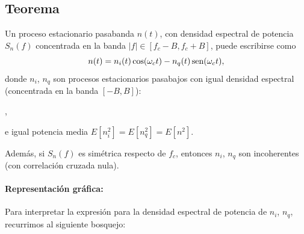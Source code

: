 \subsection*{Teorema}
Un proceso estacionario pasabanda $n(t)$, con densidad espectral
de potencia $S_n(f)$ concentrada en la banda
$|f|\in[f_c-B,f_c+B]$, puede escribirse como
\[n(t)=n_i(t)\cos(\omega_ct)-n_q(t)\operatorname{sen}(\omega_ct),\]
donde $n_i$, $n_q$ son procesos estacionarios pasabajos con igual
densidad espectral (concentrada en la banda $[-B,B]$):
\begin{center}
    ,
\end{center}
%
e igual potencia media  $E[n_i^2]=E[n_q^2]=E[n^2]$.

\noindent Además, si $S_n(f)$ es
simétrica respecto de $f_c$, entonces $n_i$, $n_q$ son incoherentes
(con correlación cruzada nula).



\paragraph{Representación gráfica:} Para interpretar la expresión para la densidad espectral de
potencia de $n_i$, $n_q$, recurrimos al siguiente bosquejo:

